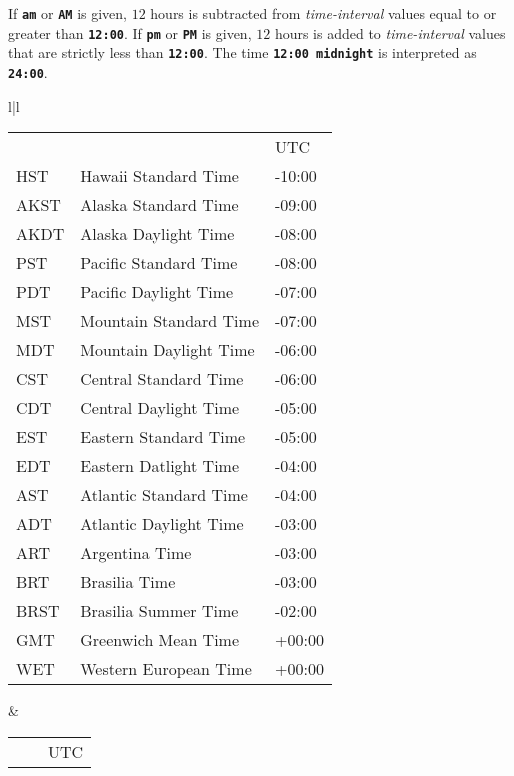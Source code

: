 \documentclass[12pt]{article}
\newcommand{\TT}[1]{{\tt \bfseries #1}}
\newlength{\figurewidth}
\newenvironment{boxedfigure}[1][!btp]%
	{\begin{figure*}[#1]
	 \begin{lrbox}{\figurebox}
	 \begin{minipage}{\figurewidth}

	 \vspace*{1ex}}%
	{
	 \vspace*{1ex}

	 \end{minipage}
	 \end{lrbox}
	 \begin{center}
	 \fbox{\hspace*{0.1in}\usebox{\figurebox}\hspace*{0.1in}}
	 \end{center}
	 \end{figure*}}
\begin{document}
If \TT{am} or \TT{AM} is given, $12$ hours is subtracted from
{\em time-interval} values equal to or greater than \TT{12:00}.
If \TT{pm} or \TT{PM} is given, $12$ hours is added to
{\em time-interval} values that are strictly less than \TT{12:00}.
The time \TT{12:00 midnight} is interpreted as \TT{24:00}.

\begin{boxedfigure}[t]

\footnotesize

\begin{center}
\begin{tabular}{l|l}
\begin{tabular}{@{}lll@{}}
      &                               & UTC \\
HST   & Hawaii Standard Time          & -10:00 \\
AKST  & Alaska Standard Time          & -09:00 \\
AKDT  & Alaska Daylight Time          & -08:00 \\
PST   & Pacific Standard Time         & -08:00 \\
PDT   & Pacific Daylight Time         & -07:00 \\
MST   & Mountain Standard Time        & -07:00 \\
MDT   & Mountain Daylight Time        & -06:00 \\
CST   & Central Standard Time         & -06:00 \\
CDT   & Central Daylight Time         & -05:00 \\
EST   & Eastern Standard Time         & -05:00 \\
EDT   & Eastern Datlight Time         & -04:00 \\
AST   & Atlantic Standard Time        & -04:00 \\
ADT   & Atlantic Daylight Time        & -03:00 \\
ART   & Argentina Time                & -03:00 \\
BRT   & Brasilia Time                 & -03:00 \\
BRST  & Brasilia Summer Time          & -02:00 \\
GMT   & Greenwich Mean Time           & +00:00 \\
WET   & Western European Time         & +00:00 \\
\end{tabular}
&
\begin{tabular}{@{}lll@{}}
      &                               & UTC \\

\end{tabular}
\end{tabular}
\end{center}
\end{boxedfigure}
\end{document}
